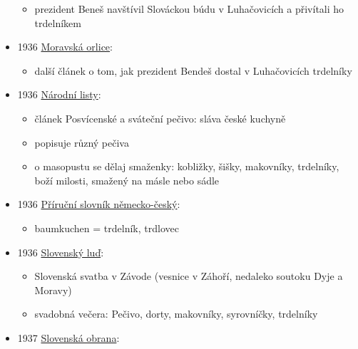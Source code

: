 \begin{itemize}
  \begin{itemize}
  \tightlist
  \item
    prezident Beneš navštívil Slováckou búdu v Luhačovicích a přivítali
    ho trdelníkem
  \end{itemize}
\item
  1936
  \href{https://ceskadigitalniknihovna.cz/view/uuid:5e938270-0675-11df-93e5-000d606f5dc6?page=uuid:37544fe0-fb63-11de-ba13-000d606f5dc6&fulltext=trdeln\%C3\%AD*&source=mzk}{Moravská
  orlice}:

  \begin{itemize}
  \tightlist
  \item
    další článek o tom, jak prezident Bendeš dostal v Luhačovicích
    trdelníky
  \end{itemize}
\item
  1936
  \href{https://ceskadigitalniknihovna.cz/view/uuid:f2e890b0-435d-11dd-b505-00145e5790ea?page=uuid\%3A6d16d5b9-435f-11dd-b505-00145e5790ea&fulltext=trdeln\%C3\%ADk\%20OR\%20trdeln\%C3\%ADky\%20OR\%20trdeln\%C3\%ADk\%C5\%AF&source=svkhk}{Národní
  listy}:

  \begin{itemize}
  \tightlist
  \item
    článek Posvícenské a sváteční pečivo: sláva české kuchyně
  \item
    popisuje různý pečiva
  \item
    o masopustu se dělaj smaženky: kobližky, šišky, makovníky,
    trdelníky, boží milosti, smažený na másle nebo sádle
  \end{itemize}
\item
  1936
  \href{https://ceskadigitalniknihovna.cz/view/uuid:d4dd6060-bfc4-11e3-aec3-005056827e52?page=uuid\%3A23cc3e33-7f1f-49cd-8c09-67351d084c07&fulltext=trdeln*&source=nkp}{Příruční
  slovník německo-český}:

  \begin{itemize}
  \tightlist
  \item
    baumkuchen = trdelník, trdlovec
  \end{itemize}
\item
  1936
  \href{https://dikda.snk.sk/uuid/uuid:36ee29c6-cef2-457b-83fa-9fc9e4bae3c5}{Slovenský
  luď}:

  \begin{itemize}
  \tightlist
  \item
    Slovenská svatba v Závode (vesnice v Záhoří, nedaleko soutoku Dyje a
    Moravy)
  \item
    svadobná večera: Pečivo, dorty, makovníky, syrovníčky, trdelníky
  \end{itemize}
\item
  1937
  \href{http://digitalna.kniznica.info/zoom/90599/view?search=trdeln\%C3\%ADk\%20OR\%20trdeln\%C3\%ADka\%20OR\%20trdeln\%C3\%ADku&page=6&p=separate&tool=search&view=1502,2130,4778,2339}{Slovenská
  obrana}:


\end{itemize}
